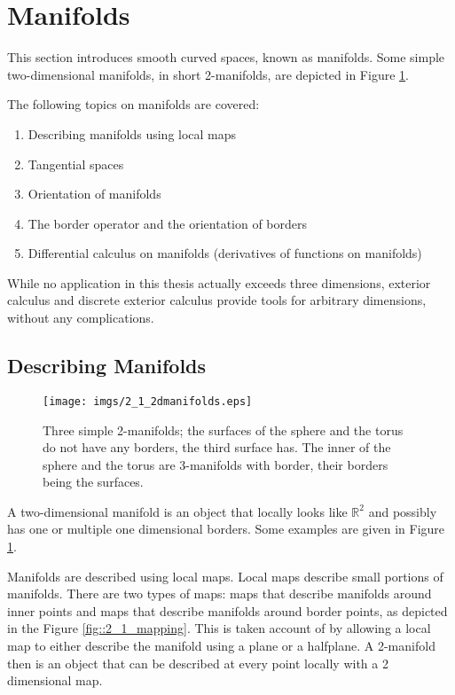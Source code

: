 \section{Manifolds}
\label{sec::2_Manifolds}
This section introduces smooth curved spaces, known as manifolds. Some simple two-dimensional manifolds, in short 2-manifolds, are depicted in Figure \ref{fig::2_1_manifold}.

The following topics on manifolds are covered:
\begin{enumerate}
\item Describing manifolds using local maps
\item Tangential spaces
\item Orientation of manifolds
\item The border operator and the orientation of borders
\item Differential calculus on manifolds (derivatives of functions on manifolds)
\end{enumerate}

While no application in this thesis actually exceeds three dimensions, exterior calculus and discrete exterior calculus provide tools for arbitrary dimensions, without any complications. 
		
\subsection{Describing Manifolds}	

\begin{figure}
	\begin{center}
		\texttt{[image: imgs/2\_1\_2dmanifolds.eps]}
	\end{center}
		\caption{Three simple 2-manifolds; the surfaces of the sphere and the torus do not have any borders, the third surface has. The inner of the sphere and the torus are 3-manifolds with border, their borders being the surfaces.}
		\label{fig::2_1_manifold}
\end{figure}

A two-dimensional manifold is an object that locally looks like $\mathbb{R}^2$ and possibly has one or multiple one dimensional borders. Some examples are given in Figure \ref{fig::2_1_manifold}.

Manifolds are described using local maps. Local maps describe small portions of manifolds. There are two types of maps: maps that describe manifolds around inner points and maps that describe manifolds around border points, as depicted in the Figure \ref{fig::2_1_mapping}. This is taken account of by allowing a local map to either describe the manifold using a plane or a halfplane. A 2-manifold then is an object that can be described at every point locally with a 2 dimensional map. 

